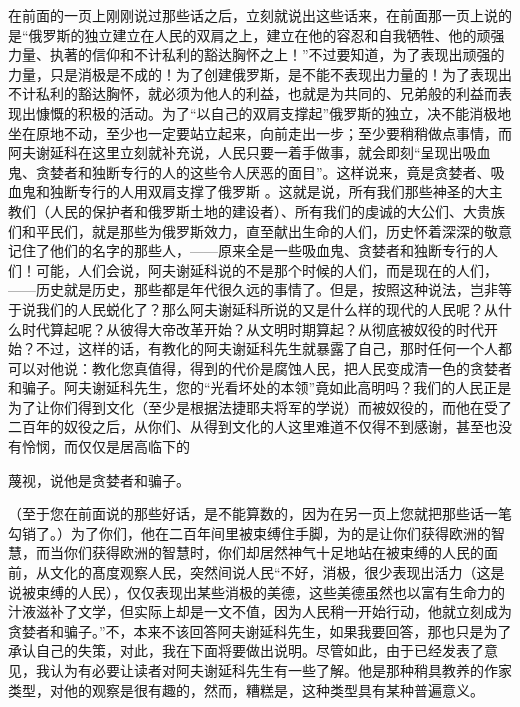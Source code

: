 \documentclass{article}
\begin{document}
在前面的一页上刚刚说过那些话之后，立刻就说出这些话来，在前面那一页上说的是“俄罗斯的独立建立在人民的双肩之上，建立在他的容忍和自我牺牲、他的顽强力量、执著的信仰和不计私利的豁达胸怀之上！”不过要知道，为了表现出顽强的力量，只是消极是不成的！为了创建俄罗斯，是不能不表现出力量的！为了表现出不计私利的豁达胸怀，就必须为他人的利益，也就是为共同的、兄弟般的利益而表现出慷慨的积极的活动。为了“以自己的双肩支撑起”俄罗斯的独立，决不能消极地坐在原地不动，至少也一定要站立起来，向前走出一步；至少要稍稍做点事情，而阿夫谢延科在这里立刻就补充说，人民只要一着手做事，就会即刻“呈现出吸血鬼、贪婪者和独断专行的人的这些令人厌恶的面目”。这样说来，竟是贪婪者、吸血鬼和独断专行的人用双肩支撑了俄罗斯
\newpage
。这就是说，所有我们那些神圣的大主教们（人民的保护者和俄罗斯土地的建设者）、所有我们的虔诚的大公们、大贵族们和平民们，就是那些为俄罗斯效力，直至献出生命的人们，历史怀着深深的敬意记住了他们的名字的那些人，——原来全是一些吸血鬼、贪婪者和独断专行的人们！可能，人们会说，阿夫谢延科说的不是那个时候的人们，而是现在的人们，——历史就是历史，那些都是年代很久远的事情了。但是，按照这种说法，岂非等于说我们的人民蜕化了？那么阿夫谢延科所说的又是什么样的现代的人民呢？从什么时代算起呢？从彼得大帝改革开始？从文明时期算起？从彻底被奴役的时代开始？不过，这样的话，有教化的阿夫谢延科先生就暴露了自己，那时任何一个人都可以对他说：教化您真值得，得到的代价是腐蚀人民，把人民变成清一色的贪婪者和骗子。阿夫谢延科先生，您的“光看坏处的本领”竟如此高明吗？我们的人民正是为了让你们得到文化（至少是根据法捷耶夫将军的学说）而被奴役的，而他在受了二百年的奴役之后，从你们、从得到文化的人这里难道不仅得不到感谢，甚至也没有怜悯，而仅仅是居高临下的

\newpage
蔑视，说他是贪婪者和骗子。 

（至于您在前面说的那些好话，是不能算数的，因为在另一页上您就把那些话一笔勾销了。）为了你们，他在二百年间里被束缚住手脚，为的是让你们获得欧洲的智慧，而当你们获得欧洲的智慧时，你们却居然神气十足地站在被束缚的人民的面前，从文化的髙度观察人民，突然间说人民“不好，消极，很少表现出活力（这是说被束缚的人民），仅仅表现出某些消极的美德，这些美德虽然也以富有生命力的汁液滋补了文学，但实际上却是一文不值，因为人民稍一开始行动，他就立刻成为贪婪者和骗子。”不，本来不该回答阿夫谢延科先生，如果我要回答，那也只是为了承认自己的失策，对此，我在下面将要做出说明。尽管如此，由于已经发表了意见，我认为有必要让读者对阿夫谢延科先生有一些了解。他是那种稍具教养的作家类型，对他的观察是很有趣的，然而，糟糕是，这种类型具有某种普遍意义。
\end{document}
